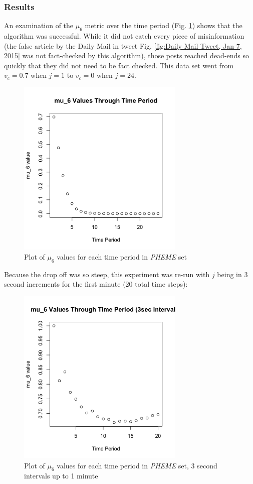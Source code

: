 \documentclass[preprint,review,12pt]{elsarticle}
\begin{document}
\subsubsection{Results}
An examination of the $\mu_6$ metric over the time period (Fig. \ref{fig:mu6 PHEME}) shows that the algorithm was successful. While it did not catch every piece of misinformation (the false article by the Daily Mail in tweet Fig. \ref{fig:Daily Mail Tweet, Jan 7, 2015} was not fact-checked by this algorithm), those posts reached dead-ends so quickly that they did not need to be fact checked. This data set went from $v_c = 0.7$ when $j = 1$ to $v_c = 0$ when $j = 24$. 

\begin{figure}[h!]
    \centering
    \includegraphics[width=8cm]{mu_6 pheme.png}
    \caption{Plot of $\mu_6$ values for each time period in \textit{PHEME} set}
    \label{fig:mu6 PHEME}
\end{figure}
 
Because the drop off was so steep, this experiment was re-run with $j$ being in 3 second increments for the first minute (20 total time steps):
\begin{figure}[h!]
    \centering
    \includegraphics[width=8cm]{mu_6 3 second intervals through one minute.png}
    \caption{Plot of $\mu_6$ values for each time period in \textit{PHEME} set, 3 second intervals up to 1 minute}
    \label{fig:mu6 PHEME 3s}
\end{figure}
\end{document}
